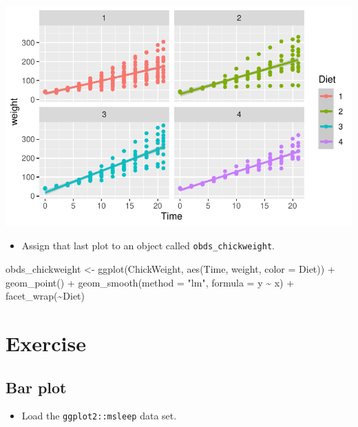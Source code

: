 \documentclass[
  letterpaper,
  DIV=11,
  numbers=noendperiod]{scrartcl}
\newenvironment{Shaded}{\begin{snugshade}}{\end{snugshade}}
\newcommand{\AttributeTok}[1]{\textcolor[rgb]{0.40,0.45,0.13}{#1}}
\newcommand{\FunctionTok}[1]{\textcolor[rgb]{0.28,0.35,0.67}{#1}}
\newcommand{\NormalTok}[1]{\textcolor[rgb]{0.00,0.23,0.31}{#1}}
\newcommand{\OtherTok}[1]{\textcolor[rgb]{0.00,0.23,0.31}{#1}}
\newcommand{\SpecialCharTok}[1]{\textcolor[rgb]{0.37,0.37,0.37}{#1}}
\newcommand{\StringTok}[1]{\textcolor[rgb]{0.13,0.47,0.30}{#1}}
\providecommand{\tightlist}{%
  \setlength{\itemsep}{0pt}\setlength{\parskip}{0pt}}\usepackage{longtable,booktabs,array}
\begin{document}
\includegraphics{5-ggplot2_kevin_files/figure-pdf/unnamed-chunk-14-1.pdf}

\begin{itemize}
\tightlist
\item
  Assign that last plot to an object called \texttt{obds\_chickweight}.
\end{itemize}

\begin{Shaded}
\begin{Highlighting}[]
\NormalTok{obds\_chickweight }\OtherTok{\textless{}{-}} \FunctionTok{ggplot}\NormalTok{(ChickWeight, }\FunctionTok{aes}\NormalTok{(Time, weight, }\AttributeTok{color =}\NormalTok{ Diet)) }\SpecialCharTok{+}
  \FunctionTok{geom\_point}\NormalTok{() }\SpecialCharTok{+}
  \FunctionTok{geom\_smooth}\NormalTok{(}\AttributeTok{method =} \StringTok{"lm"}\NormalTok{, }\AttributeTok{formula =}\NormalTok{ y }\SpecialCharTok{\textasciitilde{}}\NormalTok{ x) }\SpecialCharTok{+}
  \FunctionTok{facet\_wrap}\NormalTok{(}\SpecialCharTok{\textasciitilde{}}\NormalTok{Diet)}
\end{Highlighting}
\end{Shaded}

\section{Exercise}\label{exercise-3}

\subsection{Bar plot}\label{bar-plot}

\begin{itemize}
\tightlist
\item
  Load the \texttt{ggplot2::msleep} data set.
\end{itemize}
\end{document}
